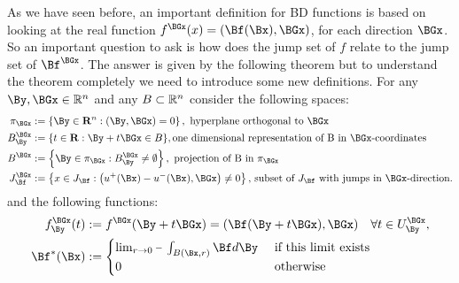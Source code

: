 As we have seen before, an important definition for BD functions is based on looking at the real function $f^{\BGx}(x)=(\Bf(\Bx), \BGx)$, for each direction $\BGx$. So an important question to ask is how does the jump set of $f$ relate to the jump set of $\Bf^{\BGx}$. The answer is given by the following theorem but to understand the theorem completely we need to introduce some new definitions. For any $\By,\BGx\in \R^n$ and any $B\subset \mathbb{R}^n$ consider the following spaces:
$$
\begin{aligned}
\pi_{\BGx} &:=\left\{\By \in \mathbf{R}^n:(\By, \BGx)=0\right\}, \text{ hyperplane orthogonal to }\BGx \\
B_\By^{\BGx} &:=\{t \in \mathbf{R}: \By+t \BGx \in B\}, \text{one dimensional representation of B in } \BGx  \text{-coordinates}\\
B^{\BGx} &:=\left\{\By \in \pi_{\BGx}: B_\By^{\BGx} \neq \emptyset\right\},\text{ projection of B in $\pi_\BGx$} \\
J_\Bf^{\BGx}&:=\left\{x \in J_\Bf:\left(u^{+}(\Bx)-u^{-}(\Bx), \BGx\right) \neq 0\right\} \text{, subset of }J_\Bf\text{ with jumps in }\BGx\text{-direction}.
\end{aligned}
$$
and the following functions:
\begin{align*}
    f_\By^{\BGx}(t)&:=f^{\BGx}(\By+t \BGx)=(\Bf(\By+t \BGx), \BGx) \quad \forall t \in U_\By^{\BGx} ,\\
    \Bf^*(\Bx)&:= \begin{cases}\lim _{r \rightarrow 0} \dashint_{B(\Bx, r)} \Bf  d \By & \text { if this limit exists } \\ 0 & \text { otherwise }\end{cases}
\end{align*}

